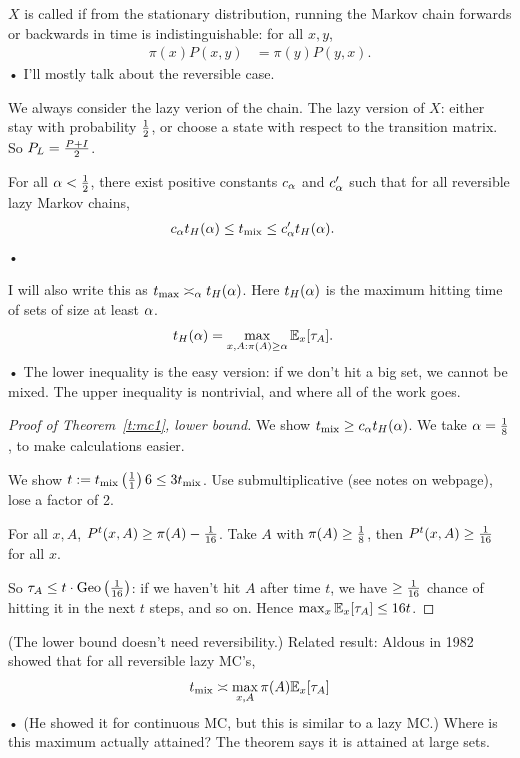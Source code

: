 $X$ is called  if from the stationary distribution, running the Markov chain forwards or backwards in time is indistinguishable: for all $x,y$,
\begin{align*}
\pi(x)P(x,y) &= \pi(y)P(y,x).
\end{align*}•
I'll mostly talk about the reversible case.

We always consider the lazy verion of the chain. The lazy version of $X$: either stay with probability $\frac{1}{2}$, or choose a state with respect to the transition matrix. So $P_L = \frac{P+I}{2}$.

\begin{thm}\label{t:mc1}
For all $\alpha<\frac{1}{2}$, there exist positive constants $c_\alpha$ and $c_\alpha'$ such that for all reversible  lazy Markov chains,
\begin{align*}
c_\alpha t_H(\alpha)&\le t_{\text{mix}} \le c_\alpha' t_H(\alpha).
\end{align*}•
\end{thm}
I will also write this as $t_{\max}\asymp_\alpha t_H(\alpha)$. 
Here $t_H(\alpha)$ is the maximum hitting time of sets of size at least $\alpha$.
\begin{align}
t_H(\alpha) &= \max_{x,A:\pi(A)\ge \alpha} \mathbb{E}_x[\tau_A].
\end{align}•
The lower inequality is the easy version: if we don't hit a big set, we cannot be mixed. The upper inequality is nontrivial, and where all of the work goes.

\begin{proof}[Proof of Theorem~\ref{t:mc1}, lower bound]
We show $t_{\text{mix}}\ge c_\alpha t_H(\alpha)$. We take $\alpha=\frac{1}{8}$, to make calculations easier.

We show $t:=t_{\text{mix}}\left( {\frac{1}{1}} \right)6\le 3t_{\text{mix}}$. Use submultiplicative (see notes on webpage), lose a factor of 2.

For all $x, A$, $P^t(x,A)\ge \pi(A)-\frac{1}{16}$. Take $A$ with $\pi(A)\ge \frac{1}{8}$, then $P^t(x,A)\ge \frac{1}{16}$ for all $x$. 

So $\tau_A \le t\cdot \text{Geo}\left( {\frac{1}{16}} \right)$: if we haven't hit $A$ after time $t$, we have $\ge \frac{1}{16}$ chance of hitting it in the next $t$ steps, and so on. 
Hence $\max_x \mathbb{E}_x[\tau_A]\le 16t$. 
\end{proof}
(The lower bound doesn't need reversibility.)
Related result: Aldous in 1982 showed that for all reversible lazy MC's,
\begin{align*}
t_{\text{mix}} \asymp \max_{x,A}\pi(A) \mathbb{E}_x[\tau_A]
\end{align*}•
(He showed it for continuous MC, but this is similar to a lazy MC.)
Where is this maximum actually attained? The theorem says it is attained at large sets.

